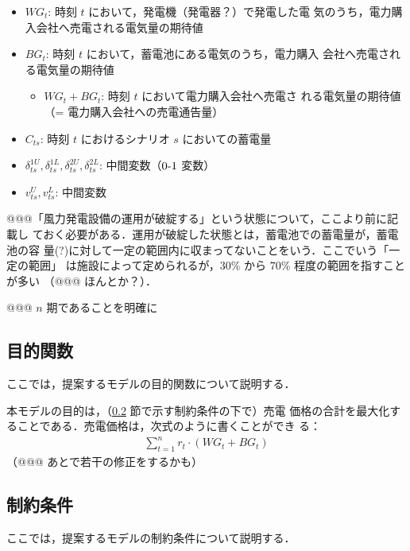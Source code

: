 \documentclass{jarticle}
\begin{document}
\begin{itemize}
\begin{itemize}
    \item $WG_t$: 時刻 $t$ において，発電機（発電器？）で発電した電
          気のうち，電力購入会社へ売電される電気量の期待値
    \item $BG_t$: 時刻 $t$ において，蓄電池にある電気のうち，電力購入
          会社へ売電される電気量の期待値
          \begin{itemize}
          \item $WG_t + BG_t$: 時刻 $t$ において電力購入会社へ売電さ
            れる電気量の期待値（= 電力購入会社への売電通告量）
          \end{itemize}
    \item $C_{ts}$: 時刻 $t$ におけるシナリオ $s$ においての蓄電量
    \item $\delta^{1U}_{ts}, \delta^{1L}_{ts}, \delta^{2U}_{ts},
          \delta^{2L}_{ts}$: 中間変数（$0\mathchar`-1$ 変数）
    \item $v^U_{ts}, v^L_{ts}$: 中間変数
      \end{itemize}
\end{itemize}

@@@「風力発電設備の運用が破綻する」という状態について，ここより前に記載し
ておく必要がある．運用が破綻した状態とは，蓄電池での蓄電量が，蓄電池の容
量(?)に対して一定の範囲内に収まってないことをいう．ここでいう「一定の範囲」
は施設によって定められるが，$30$\% から $70$\% 程度の範囲を指すことが多い
（@@@ ほんとか？）．

@@@ $n$ 期であることを明確に

\subsection{目的関数}

ここでは，提案するモデルの目的関数について説明する．

本モデルの目的は，（\ref{subsec:constraints} 節で示す制約条件の下で）売電
価格の合計を最大化することである．売電価格は，次式のように書くことができ
る：
%
\begin{eqnarray}
\sum_{t = 1}^n r_t \cdot (WG_t + BG_t)
  \label{eq:obj}
\end{eqnarray}
%
（@@@ あとで若干の修正をするかも）

\subsection{制約条件}
\label{subsec:constraints}

ここでは，提案するモデルの制約条件について説明する．
\end{document}
